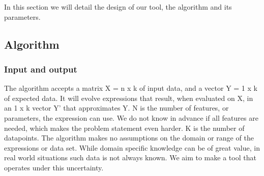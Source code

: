 In this section we will detail the design of our tool, the algorithm and its parameters. 
\subsection{Algorithm}
\subsubsection{Input and output}
The algorithm accepts a matrix X = n x k of input data, and a vector Y = 1 x k of expected data. It will evolve expressions that result, when evaluated on X, in an 1 x k vector Y' that approximates Y. N is the number of features, or parameters, the expression can use. We do not know in advance if all features are needed, which makes the problem statement even harder.
K is the number of datapoints. The algorithm makes no assumptions on the domain or range of the expressions or data set. While domain specific knowledge can be of great value, in real world situations such data is not always known. We aim to make a tool that operates under this uncertainty.
